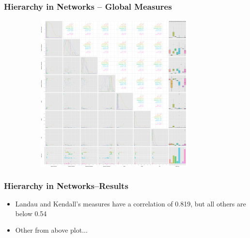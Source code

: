 \documentclass[xcolor={table}]{beamer}
\newenvironment{changemargin}[2]{%
  \begin{list}{}{%
    \setlength{\topsep}{0pt}%
    \setlength{\leftmargin}{#1}%
    \setlength{\rightmargin}{#2}%
    \setlength{\listparindent}{\parindent}%
    \setlength{\itemindent}{\parindent}%
    \setlength{\parsep}{\parskip}%
  }%
  \item[]}{\end{list}}
\begin{document}
\begin{frame}\frametitle{Hierarchy in Networks -- Global Measures}
\begin{changemargin}{-2cm}{ -2cm}
	\centering
	\includegraphics[width=12cm, height=8cm]{images/Fancy_Pairs_Plot.pdf}
\end{changemargin}
\end{frame}

\begin{frame}\frametitle{Hierarchy in Networks--Results}
	\begin{itemize}
		\item Landau and Kendall's measures have a correlation of 0.819, but all others are below 0.54
		\item Other from above plot...
	\end{itemize}
\end{frame}
\end{document}

